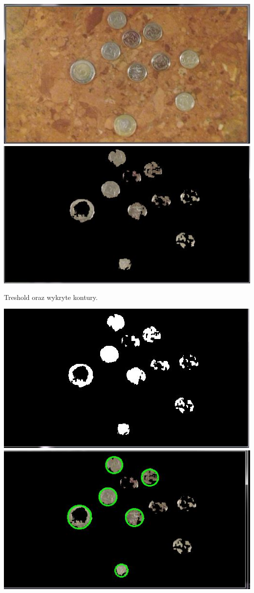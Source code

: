 \documentclass[12pt]{article}
\begin{document}
\includegraphics[scale=0.4]{picture_024}
\includegraphics[scale=0.4]{removeNotSilver}

Treshold oraz wykryte kontury.

\includegraphics[scale=0.4]{removeNotSilverTresh}
\includegraphics[scale=0.4]{removeNotSilverResult}
\end{document}
